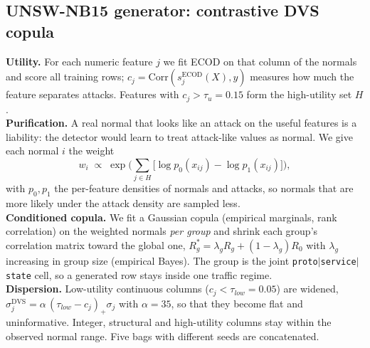 \documentclass[10pt,a4paper]{article}
\begin{document}
\subsection{UNSW-NB15 generator: contrastive DVS copula}
\textbf{Utility.} For each numeric feature $j$ we fit ECOD on that column of the normals and score all training rows; $c_j=\mathrm{Corr}(s^{\mathrm{ECOD}}_j(X),y)$ measures how much the feature separates attacks. Features with $c_j>\tau_u=0.15$ form the high-utility set $H$.\\
\textbf{Purification.} A real normal that looks like an attack on the useful features is a liability: the detector would learn to treat attack-like values as normal. We give each normal $i$ the weight
\begin{equation}
w_i\;\propto\;\exp\!\Big(\sum_{j\in H}\big[\log p_0(x_{ij})-\log p_1(x_{ij})\big]\Big),
\end{equation}
with $p_0,p_1$ the per-feature densities of normals and attacks, so normals that are more likely under the attack density are sampled less.\\
\textbf{Conditioned copula.} We fit a Gaussian copula (empirical marginals, rank correlation) on the weighted normals \emph{per group} and shrink each group's correlation matrix toward the global one,
$R^{*}_g=\lambda_g R_g+(1-\lambda_g)R_0$ with $\lambda_g$ increasing in group size (empirical Bayes). The group is the joint \texttt{proto}$|$\texttt{service}$|$\texttt{state} cell, so a generated row stays inside one traffic regime.\\
\textbf{Dispersion.} Low-utility continuous columns ($c_j<\tau_{low}=0.05$) are widened, $\sigma^{\mathrm{DVS}}_j=\alpha\,(\tau_{low}-c_j)_+\sigma_j$ with $\alpha=35$, so that they become flat and uninformative. Integer, structural and high-utility columns stay within the observed normal range. Five bags with different seeds are concatenated.
\end{document}
